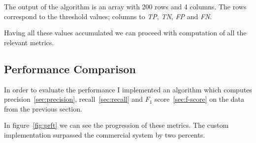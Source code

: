 The output of the algorithm is an array with 200 rows and 4 columns.
The rows correspond to the threshold values; columns to \textit{TP}, \textit{TN}, \textit{FP} and \textit{FN}.

Having all these values accumulated we can proceed with computation of all the relevant metrics.

\subsection{Performance Comparison}\label{subsec:performance-comparison}
In order to evaluate the performance I implemented an algorithm which computes precision~\ref{sec:precision},
recall~\ref{sec:recall} and $F_1$ score~\ref{sec:f-score} on the data from the previous section.

In figure~\ref{fig:prft} we can see the progression of these metrics.
The custom implementation surpassed the commercial system by two percents.

